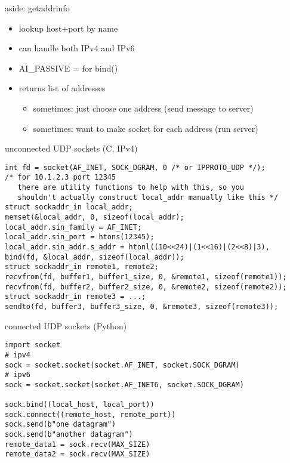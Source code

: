 \begin{frame}{aside: getaddrinfo}
    \begin{itemize}
    \item lookup host+port by name
    \item can handle both IPv4 and IPv6
    \item AI\_PASSIVE = for bind()
    \item returns list of addresses
        \begin{itemize}
        \item sometimes: just choose one address (send message to server)
        \item sometimes: want to make socket for each address (run server)
        \end{itemize}
    \end{itemize}
\end{frame}

\begin{frame}[fragile]{unconnected UDP sockets (C, IPv4)}
\begin{Verbatim}[fontsize=\small]
int fd = socket(AF_INET, SOCK_DGRAM, 0 /* or IPPROTO_UDP */);
/* for 10.1.2.3 port 12345 
   there are utility functions to help with this, so you 
   shouldn't actually construct local_addr manually like this */
struct sockaddr_in local_addr;
memset(&local_addr, 0, sizeof(local_addr);
local_addr.sin_family = AF_INET;
local_addr.sin_port = htons(12345);
local_addr.sin_addr.s_addr = htonl((10<<24)|(1<<16)|(2<<8)|3),
bind(fd, &local_addr, sizeof(local_addr));
struct sockaddr_in remote1, remote2;
recvfrom(fd, buffer1, buffer1_size, 0, &remote1, sizeof(remote1));
recvfrom(fd, buffer2, buffer2_size, 0, &remote2, sizeof(remote2));
struct sockaddr_in remote3 = ...;
sendto(fd, buffer3, buffer3_size, 0, &remote3, sizeof(remote3));
\end{Verbatim}
\end{frame}

\begin{frame}[fragile]{connected UDP sockets (Python)}
\begin{Verbatim}[fontsize=\small]
import socket
# ipv4
sock = socket.socket(socket.AF_INET, socket.SOCK_DGRAM)
# ipv6
sock = socket.socket(socket.AF_INET6, socket.SOCK_DGRAM)

sock.bind((local_host, local_port))
sock.connect((remote_host, remote_port))
sock.send(b"one datagram")
sock.send(b"another datagram")
remote_data1 = sock.recv(MAX_SIZE)
remote_data2 = sock.recv(MAX_SIZE)
\end{Verbatim}
\end{frame}

